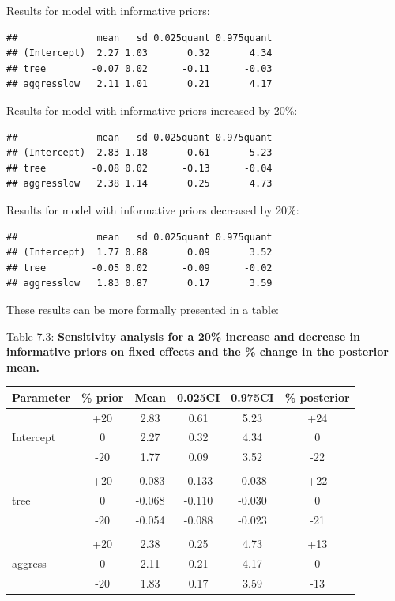 \documentclass[
]{book}
\begin{document}
Results for model with informative priors:

\begin{verbatim}
##              mean   sd 0.025quant 0.975quant
## (Intercept)  2.27 1.03       0.32       4.34
## tree        -0.07 0.02      -0.11      -0.03
## aggresslow   2.11 1.01       0.21       4.17
\end{verbatim}

Results for model with informative priors increased by 20\%:

\begin{verbatim}
##              mean   sd 0.025quant 0.975quant
## (Intercept)  2.83 1.18       0.61       5.23
## tree        -0.08 0.02      -0.13      -0.04
## aggresslow   2.38 1.14       0.25       4.73
\end{verbatim}

Results for model with informative priors decreased by 20\%:

\begin{verbatim}
##              mean   sd 0.025quant 0.975quant
## (Intercept)  1.77 0.88       0.09       3.52
## tree        -0.05 0.02      -0.09      -0.02
## aggresslow   1.83 0.87       0.17       3.59
\end{verbatim}

These results can be more formally presented in a table:

Table 7.3: \textbf{Sensitivity analysis for a 20\% increase and decrease in informative priors on fixed effects and the \% change in the posterior mean.}

\begin{longtable}[]{@{}lccccc@{}}
\toprule
Parameter & \% prior & Mean & 0.025CI & 0.975CI & \% posterior \\
\midrule
\endhead
& +20 & 2.83 & 0.61 & 5.23 & +24 \\
Intercept & 0 & 2.27 & 0.32 & 4.34 & 0 \\
& -20 & 1.77 & 0.09 & 3.52 & -22 \\
& & & & & \\
& +20 & -0.083 & -0.133 & -0.038 & +22 \\
tree & 0 & -0.068 & -0.110 & -0.030 & 0 \\
& -20 & -0.054 & -0.088 & -0.023 & -21 \\
& & & & & \\
& +20 & 2.38 & 0.25 & 4.73 & +13 \\
aggress & 0 & 2.11 & 0.21 & 4.17 & 0 \\
& -20 & 1.83 & 0.17 & 3.59 & -13 \\
\bottomrule
\end{longtable}
\end{document}
